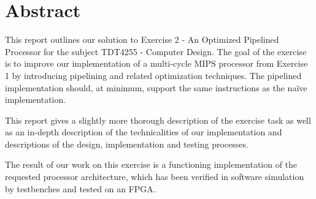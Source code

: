 \chapter*{Abstract}

This report outlines our solution to Exercise 2 - An Optimized Pipelined Processor for the subject TDT4255 - Computer Design.
The goal of the exercise is to improve our implementation of a multi-cycle MIPS processor from Exercise 1 by introducing pipelining and related optimization techniques.
The pipelined implementation should, at minimum, support the same instructions as the naïve implementation.

This report gives a slightly more thorough description of the exercise task as well as an in-depth description of the technicalities of our implementation and descriptions of the design, implementation and testing processes.

The result of our work on this exercise is a functioning implementation of the requested processor architecture, which has been verified in software simulation by testbenches and tested on an FPGA.
